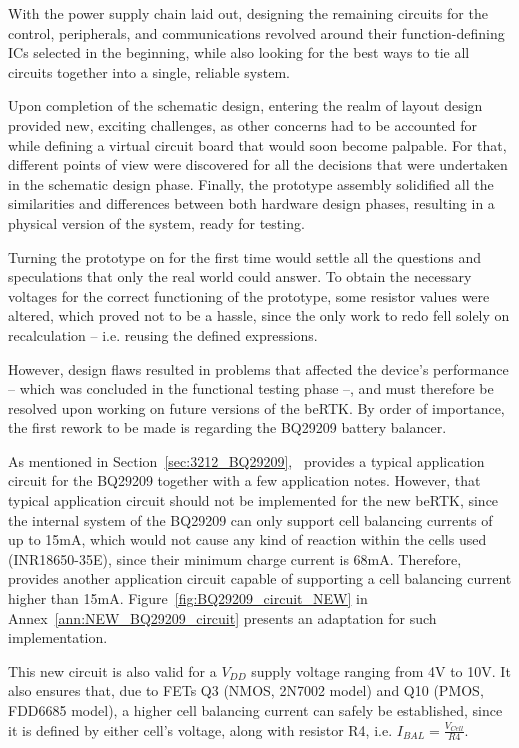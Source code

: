 With the power supply chain laid out, designing the remaining circuits for the control, peripherals, and communications revolved around their function-defining ICs selected in the beginning, while also looking for the best ways to tie all circuits together into a single, reliable system.

Upon completion of the schematic design, entering the realm of layout design provided new, exciting challenges, as other concerns had to be accounted for while defining a virtual circuit board that would soon become palpable. For that, different points of view were discovered for all the decisions that were undertaken in the schematic design phase. Finally, the prototype assembly solidified all the similarities and differences between both hardware design phases, resulting in a physical version of the system, ready for testing.

Turning the prototype on for the first time would settle all the questions and speculations that only the real world could answer. To obtain the necessary voltages for the correct functioning of the prototype, some resistor values were altered, which proved not to be a hassle, since the only work to redo fell solely on recalculation -- i.e. reusing the defined expressions.

However, design flaws resulted in problems that affected the device's performance -- which was concluded in the functional testing phase --, and must therefore be resolved upon working on future versions of the beRTK\textsuperscript{\textregistered}. By order of importance, the first rework to be made is regarding the BQ29209 battery balancer. 

As mentioned in Section~\ref{sec:3212_BQ29209},~\cite{bq29209} provides a typical application circuit for the BQ29209 together with a few application notes. However, that typical application circuit should not be implemented for the new beRTK\textsuperscript{\textregistered}, since the internal system of the BQ29209 can only support cell balancing currents of up to 15mA, which would not cause any kind of reaction within the cells used (INR18650-35E), since their minimum charge current is 68mA. Therefore,~\cite{bq29209} provides another application circuit capable of supporting a cell balancing current higher than 15mA. Figure~\ref{fig:BQ29209_circuit_NEW} in Annex~\ref{ann:NEW_BQ29209_circuit} presents an adaptation for such implementation.

This new circuit is also valid for a $V_{DD}$ supply voltage ranging from 4V to 10V. It also ensures that, due to FETs Q3 (NMOS, 2N7002 model) and Q10 (PMOS, FDD6685 model), a higher cell balancing current can safely be established, since it is defined by either cell's voltage, along with resistor R4, i.e. $I_{BAL}=\frac{V_{Cell}}{R4}$.

